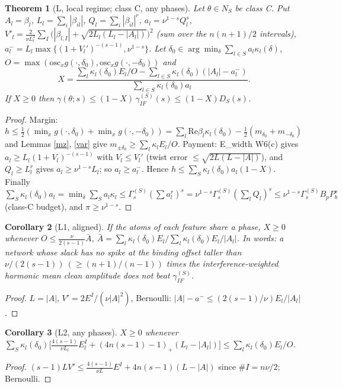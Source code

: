 \documentclass[11pt]{article}
\newtheorem{theorem}{Theorem}\newtheorem{proposition}[theorem]{Proposition}\newtheorem{lemma}[theorem]{Lemma}
\newtheorem{corollary}[theorem]{Corollary}
\theoremstyle{remark}\newtheorem{remark}[theorem]{Remark}
\begin{document}
\begin{theorem}[L, local regime; class C, any phases]\label{L}
Let $\theta\in N_S$ be class C. Put $A_l=\beta_l$, $L_l=\sum_i|\beta_{il}|$, $Q_l=\sum_i|\beta_{il}|^r$, $a_l=\nu^{1-s}Q_l^s$,
$V'_l=\frac{2}{\nu L_l^2}\sum_{I}\big(|\beta_{l,I}|+\sqrt{2L_l(L_l-|A_l|)}\big)^2$ (sum over the $n(n+1)/2$ intervals), $a_l^-=L_l\max\{(1+V_l')^{-(s-1)},\nu^{1-s}\}$.
Let $\delta_0\in\arg\min_\delta\sum_{l\in S}a_l\kappa_l(\delta)$, $O=\max(\mathrm{osc}_xg(\cdot,\delta_0),\mathrm{osc}_xg(\cdot,-\delta_0))$ and
\[X=\frac{\sum_{l}\kappa_l(\delta_0)E_l/O-\sum_{l\in S}\kappa_l(\delta_0)(|A_l|-a_l^-)}{\sum_{l\in S}\kappa_l(\delta_0)a_l}.\]
If $X\ge0$ then $\gamma(\theta;s)\le(1-X)\,\gamma_{IF}^{(S)}(s)\le(1-X)D_S(s)$.\end{theorem}
\begin{proof} Margin: $h\le\tfrac12(\min_xg(\cdot,\delta_0)+\min_xg(\cdot,-\delta_0))=\sum_l\mathrm{Re}\beta_l\kappa_l(\delta_0)-\tfrac12(m_{\delta_0}+m_{-\delta_0})$
and Lemmas \ref{mz}, \ref{var} give $m_{\pm\delta_0}\ge\sum_l\kappa_lE_l/O$. Payment: E\_width W6(c) gives $a_l\ge L_l(1+V_l)^{-(s-1)}$ with
$V_l\le V_l'$ (twist error $\le\sqrt{2L(L-|A|)}$), and $Q_l\ge L_l^r$ gives $a_l\ge\nu^{1-s}L_l$; so $a_l\ge a_l^-$. Hence
$h\le\sum_{S}\kappa_l(\delta_0)a_l(1-X)$. Finally $\sum_S\kappa_l(\delta_0)a_l=\min_\delta\sum_Sa_l\kappa_l\le\Gamma_s^{(S)}(\sum a_l^r)^s=
\nu^{1-s}\Gamma^{(S)}_s(\sum_lQ_l)^s\le\nu^{1-s}\Gamma^{(S)}_sB_pP_b^s$ (class-C budget), and $\pi\ge\nu^{1-s}$.\end{proof}

\begin{corollary}[L1, aligned]\label{L1} If the atoms of each feature share a phase, $X\ge0$ whenever
$O\le\frac{\nu}{2(s-1)}\bar A$, $\bar A=\sum_l\kappa_l(\delta_0)E_l\big/\sum_l\kappa_l(\delta_0)E_l/|A_l|$. In words: a network whose slack has no spike
at the binding offset taller than $\nu/(2(s-1))\ (\ge(n+1)/(n-1))$ times the interference-weighted harmonic mean clean amplitude does not beat $\gamma_{IF}^{(S)}$.\end{corollary}
\begin{proof} $L=|A|$, $V'=2E^I/(\nu|A|^2)$, Bernoulli: $|A|-a^-\le(2(s-1)/\nu)E_l/|A_l|$.\end{proof}
\begin{corollary}[L2, any phases] $X\ge0$ whenever $\sum_S\kappa_l(\delta_0)\big[\frac{4(s-1)}{\nu L_l}E^I_l+(4n(s-1)-1)_+(L_l-|A_l|)\big]\le\sum_l\kappa_l(\delta_0)E_l/O$.\end{corollary}
\begin{proof} $(s-1)L V'\le\frac{4(s-1)}{\nu L}E^I+4n(s-1)(L-|A|)$ since $\#I=n\nu/2$; Bernoulli.\end{proof}
\end{document}
